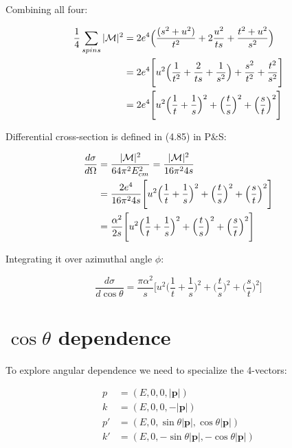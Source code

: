 \documentclass[11pt]{article}
\begin{document}
Combining all four:

\begin{equation}
  \begin{split}
    \frac{1} {4} \sum_{spins} |{\cal{M}}|^2 & = 2 e^4 \Big (
      \frac{( s^2 + u^2 )} {t^2} + 2 \frac{u^2} {ts} + \frac{t^2 + u^2} {s^2} \Big ) \\
    & = 2 e^4 \Bigg [
      u^2 \Big ( \frac{1}{t^2} + \frac{2}{ts} + \frac{1}{s^2} \Big ) +
      \frac {s^2}{t^2} + \frac{t^2}{s^2} \Bigg ] \\
    & = 2 e^4 \Bigg [
      u^2 \Big ( \frac{1}{t} + \frac{1}{s} \Big )^2 +
      \Big ( \frac{t} {s} \Big )^2  +
      \Big ( \frac{s} {t} \Big )^2 \Bigg ]
  \end{split}
\end{equation}

Differential cross-section is defined in (4.85) in P\&S:

\begin{equation}
  \begin{split}
    \frac{d \sigma} {d \Omega} & = \frac{ |{\cal{M}}|^2 } { 64 \pi^2 E_{cm}^2 }  =
        \frac{ |{\cal{M}}|^2 } { 16 \pi^2 4s } \\
      & = \frac{2 e^4} {16 \pi^2 4s} \Bigg [
      u^2 \Big ( \frac{1}{t} + \frac{1}{s} \Big )^2 +
      \Big ( \frac{t} {s} \Big )^2  +
      \Big ( \frac{s} {t} \Big )^2 \Bigg ] \\
      & = \frac{\alpha^2} {2s} \Bigg [
      u^2 \Big ( \frac{1}{t} + \frac{1}{s} \Big )^2 +
      \Big ( \frac{t} {s} \Big )^2  +
      \Big ( \frac{s} {t} \Big )^2 \Bigg ]
  \end{split}
\end{equation}

Integrating it over azimuthal angle $\phi$:

\begin{equation}
\frac{d \sigma} {d \cos \theta} = \frac{\pi \alpha^2} {s} \Bigg [
      u^2 \Big ( \frac{1}{t} + \frac{1}{s} \Big )^2 +
      \Big ( \frac{t} {s} \Big )^2  +
      \Big ( \frac{s} {t} \Big )^2 \Bigg ]
\end{equation}

\section{$\cos \theta$ dependence}

To explore angular dependence we need to specialize the 4-vectors:

\begin{equation}
  \begin{split}
    p & = (E, 0, 0, |\textbf{p}|) \\
    k & = (E, 0, 0, -|\textbf{p}|) \\
    p' &= (E, 0, \sin \theta |\textbf{p}|, \cos \theta |\textbf{p}| ) \\
    k' &= (E, 0, -\sin \theta |\textbf{p}|, -\cos \theta |\textbf{p}| )
  \end{split}
\end{equation}
\end{document}
